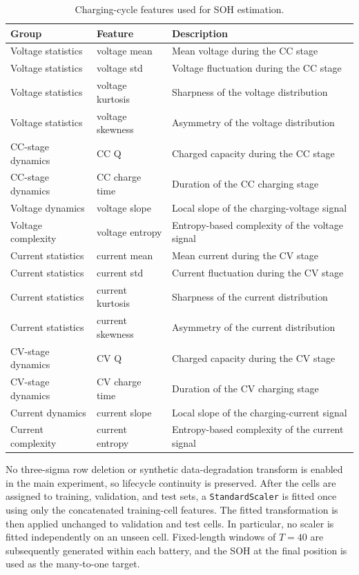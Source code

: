 \documentclass[a4paper,fleqn]{cas-dc}
\begin{document}
\begin{table}[t]
\caption{Charging-cycle features used for SOH estimation.}
\label{tab:features}
\centering
\begin{tabular}{lll}
\toprule
Group & Feature & Description \\
\midrule
Voltage statistics & voltage mean & Mean voltage during the CC stage \\
Voltage statistics & voltage std & Voltage fluctuation during the CC stage \\
Voltage statistics & voltage kurtosis & Sharpness of the voltage distribution \\
Voltage statistics & voltage skewness & Asymmetry of the voltage distribution \\
CC-stage dynamics & CC Q & Charged capacity during the CC stage \\
CC-stage dynamics & CC charge time & Duration of the CC charging stage \\
Voltage dynamics & voltage slope & Local slope of the charging-voltage signal \\
Voltage complexity & voltage entropy & Entropy-based complexity of the voltage signal \\
Current statistics & current mean & Mean current during the CV stage \\
Current statistics & current std & Current fluctuation during the CV stage \\
Current statistics & current kurtosis & Sharpness of the current distribution \\
Current statistics & current skewness & Asymmetry of the current distribution \\
CV-stage dynamics & CV Q & Charged capacity during the CV stage \\
CV-stage dynamics & CV charge time & Duration of the CV charging stage \\
Current dynamics & current slope & Local slope of the charging-current signal \\
Current complexity & current entropy & Entropy-based complexity of the current signal \\
\bottomrule
\end{tabular}
\end{table}

No three-sigma row deletion or synthetic data-degradation transform is enabled in the main experiment, so lifecycle continuity is preserved. After the cells are assigned to training, validation, and test sets, a \texttt{StandardScaler} is fitted once using only the concatenated training-cell features. The fitted transformation is then applied unchanged to validation and test cells. In particular, no scaler is fitted independently on an unseen cell. Fixed-length windows of $T=40$ are subsequently generated within each battery, and the SOH at the final position is used as the many-to-one target.
\end{document}
